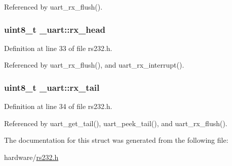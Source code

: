 Referenced by uart\+\_\+rx\+\_\+flush().

\subsubsection[{\texorpdfstring{rx\+\_\+head}{rx_head}}]{\setlength{\rightskip}{0pt plus 5cm}uint8\+\_\+t \+\_\+uart\+::rx\+\_\+head}\hypertarget{struct__uart_add14728bfbde14b7c260c8ff09bcd91b}{}\label{struct__uart_add14728bfbde14b7c260c8ff09bcd91b}


Definition at line 33 of file rs232.\+h.



Referenced by uart\+\_\+rx\+\_\+flush(), and uart\+\_\+rx\+\_\+interrupt().

\subsubsection[{\texorpdfstring{rx\+\_\+tail}{rx_tail}}]{\setlength{\rightskip}{0pt plus 5cm}uint8\+\_\+t \+\_\+uart\+::rx\+\_\+tail}\hypertarget{struct__uart_a4bd6a544526fe5ac94a5f9af09e3bbeb}{}\label{struct__uart_a4bd6a544526fe5ac94a5f9af09e3bbeb}


Definition at line 34 of file rs232.\+h.



Referenced by uart\+\_\+get\+\_\+tail(), uart\+\_\+peek\+\_\+tail(), and uart\+\_\+rx\+\_\+flush().



The documentation for this struct was generated from the following file\+:\begin{DoxyCompactItemize}
\item 
hardware/\hyperlink{rs232_8h}{rs232.\+h}\end{DoxyCompactItemize}
